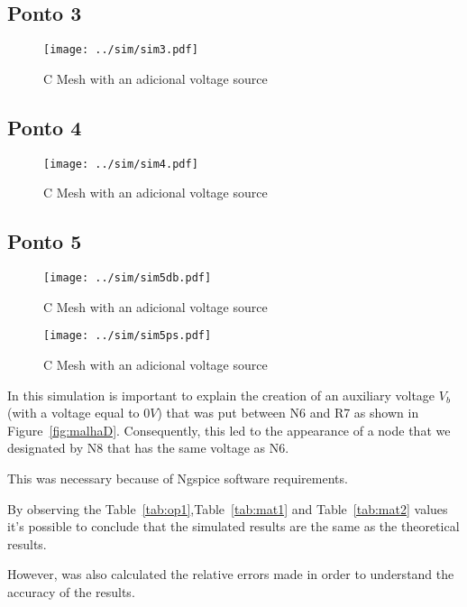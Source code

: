 \subsection{Ponto 3}

\begin{figure}[h] \centering
\texttt{[image: ../sim/sim3.pdf]}
\caption{C Mesh with an adicional voltage source} %
\label{fig:sim3}
\end{figure}

\subsection{Ponto 4}

\begin{figure}[h] \centering
\texttt{[image: ../sim/sim4.pdf]}
\caption{C Mesh with an adicional voltage source} %
\label{fig:sim4}
\end{figure}

\subsection{Ponto 5}

\begin{figure}[h] \centering
\texttt{[image: ../sim/sim5db.pdf]}
\caption{C Mesh with an adicional voltage source} %
\label{fig:sim5db}
\end{figure}

\begin{figure}[h] \centering
\texttt{[image: ../sim/sim5ps.pdf]}
\caption{C Mesh with an adicional voltage source} %
\label{fig:sim5ps}
\end{figure}

In this simulation is important to explain the creation of an auxiliary voltage $V_b$ (with a voltage equal to $0V$) that was put between N6 and R7 as shown in Figure~\ref{fig:malhaD}. Consequently, this led to the appearance of a node that we designated by N8 that has the same voltage as N6.

This was necessary because of Ngspice software requirements.

By observing the Table~\ref{tab:op1},Table~\ref{tab:mat1} and Table~\ref{tab:mat2} values it's possible to conclude that the simulated results are the same as the theoretical results.%


However, was also calculated the relative errors made in order to understand the accuracy of the results. 


